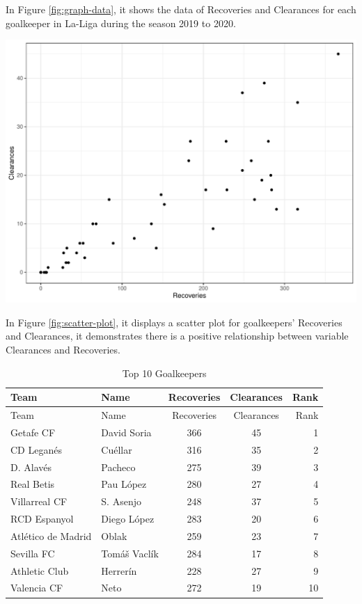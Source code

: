 \documentclass[11pt,a4paper,]{article}
\let\origfigure\figure
\let\endorigfigure\endfigure
\renewenvironment{figure}[1][2] {
    \expandafter\origfigure\expandafter[H]
} {
    \endorigfigure
}
\begin{document}
In Figure \ref{fig:graph-data}, it shows the data of Recoveries and Clearances for each goalkeeper in La-Liga during the season 2019 to 2020.

\begin{figure}[H]

{\centering \includegraphics[width=0.8\linewidth]{Assignment-4-ETC5513_files/figure-latex/scatter-plot-1} 

}

\caption{Scatter plot for Recoveries and Clearances}\label{fig:scatter-plot}
\end{figure}

In Figure \ref{fig:scatter-plot}, it displays a scatter plot for goalkeepers' Recoveries and Clearances, it demonstrates there is a positive relationship between variable Clearances and Recoveries.

\begin{longtable}[]{@{}llccr@{}}
\caption{\label{tab:goal-data1}Top 10 Goalkeepers}\tabularnewline
\toprule
Team & Name & Recoveries & Clearances & Rank \\
\midrule
\endfirsthead
\toprule
Team & Name & Recoveries & Clearances & Rank \\
\midrule
\endhead
Getafe CF & David Soria & 366 & 45 & 1 \\
CD Leganés & Cuéllar & 316 & 35 & 2 \\
D. Alavés & Pacheco & 275 & 39 & 3 \\
Real Betis & Pau López & 280 & 27 & 4 \\
Villarreal CF & S. Asenjo & 248 & 37 & 5 \\
RCD Espanyol & Diego López & 283 & 20 & 6 \\
Atlético de Madrid & Oblak & 259 & 23 & 7 \\
Sevilla FC & Tomáš Vaclík & 284 & 17 & 8 \\
Athletic Club & Herrerín & 228 & 27 & 9 \\
Valencia CF & Neto & 272 & 19 & 10 \\
\bottomrule
\end{longtable}
\end{document}
